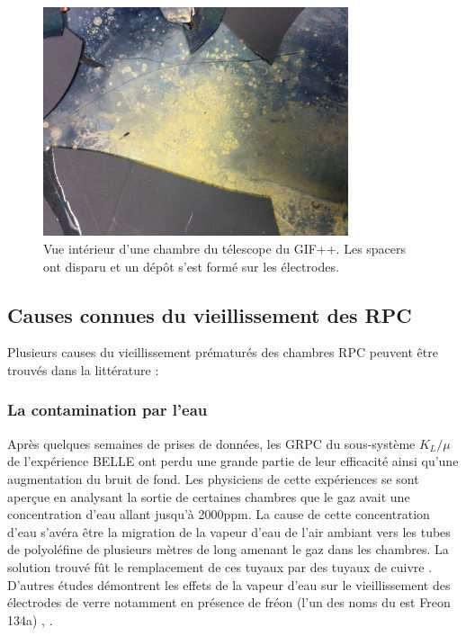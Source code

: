 \begin{figure}[!ht]
	\centering
	\includegraphics[width=0.8\textwidth]{GLA/depot.jpg}
	\caption{Vue intérieur d'une chambre du télescope du GIF++. Les spacers ont disparu et un dépôt s'est formé sur les électrodes. }
	\label{depot}
\end{figure}



\subsection{Causes connues du vieillissement des RPC }
Plusieurs causes du vieillissement prématurés des chambres RPC peuvent être trouvés dans la littérature :

\subsubsection{La contamination par l'eau}
Après quelques semaines de prises de données, les GRPC du sous-système $K_{L}/\mu$ de l'expérience BELLE ont perdu une grande partie de leur efficacité ainsi qu'une augmentation du bruit de fond. Les physiciens de cette expériences se sont aperçue en analysant la sortie de certaines chambres que le gaz avait une concentration d'eau allant jusqu'à \num{2000}ppm. La cause de cette concentration d'eau s'avéra être la migration de la vapeur d'eau de l'air ambiant  vers les tubes de polyoléfine de plusieurs mètres de long amenant le gaz dans les chambres. La solution trouvé fût le remplacement de ces tuyaux par des tuyaux de cuivre \cite{Abashian:2000vb}. D'autres études démontrent les effets de la vapeur d'eau sur le vieillissement des électrodes de verre notamment en présence de fréon (l'un des noms du  est Freon 134a) \cite{Sakai:772080}, \cite{Kubo:2002jq}.

